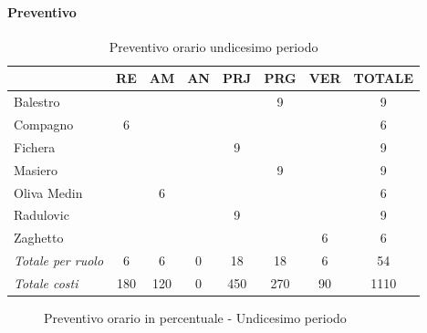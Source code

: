 \documentclass[a4paper,12pt]{article}
\begin{document}
            \paragraph{Preventivo}
                \begin{table}[H]
                \centering
                \caption{Preventivo orario undicesimo periodo}
                \begin{tabular}{|l|c|c|c|c|c|c|c|}
                \hline
                    \rowcolor{lightgray}{\textbf{Membro}} & {\textbf{RE}} & {\textbf{AM}} & {\textbf{AN}} & {\textbf{PRJ}} & {\textbf{PRG}} & {\textbf{VER}} & {\textbf{TOTALE}}\\
                \hline
                    Balestro & & & & & 9 & & 9\\
                \hline
                    Compagno & 6 & & & & & & 6\\
                \hline
                    Fichera & & & & 9 & & & 9\\
                \hline
                    Masiero & & & & & 9 & & 9\\
                \hline
                    Oliva Medin & & 6 & & & & & 6\\
                \hline
                    Radulovic & & & & 9 & & & 9\\
                \hline
                    Zaghetto & & & & & & 6 & 6\\
                \hline
                    \rowcolor{lightgray}\textit{Totale per ruolo} & 6 & 6 & 0 & 18 & 18 & 6 & 54\\
                \hline
                    \rowcolor{lightgray}\textit{Totale costi} & 180 & 120 & 0 & 450 & 270 & 90 & 1110\\
                \hline
                \end{tabular}
                \end{table}

                \begin{figure}[H]
                \centering
                \caption{Preventivo orario in percentuale - Undicesimo periodo}
                \end{figure}
                
\end{document}
